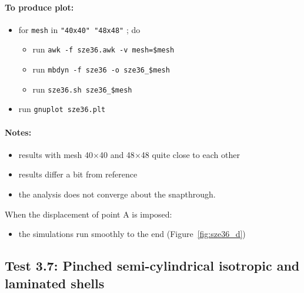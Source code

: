 \documentclass{article}
\newcommand{\mesh}[2]{#1$\times$#2}
\begin{document}
\paragraph{To produce plot:}
\begin{itemize}
\item for \verb!mesh! in \verb!"40x40" "48x48"! ; do
	\begin{itemize}
	\item run \verb!awk -f sze36.awk -v mesh=$mesh!
	\item run \verb!mbdyn -f sze36 -o sze36_$mesh!
	\item run \verb!sze36.sh sze36_$mesh!
	\end{itemize}
\item run \verb!gnuplot sze36.plt!
\end{itemize}

\paragraph{Notes:}
\begin{itemize}
\item results with mesh \mesh{40}{40} and \mesh{48}{48} quite close to each other
\item results differ a bit from reference
\item the analysis does not converge about the snapthrough.
\end{itemize}
When the displacement of point A is imposed:
\begin{itemize}
\item the simulations run smoothly to the end (Figure~\ref{fig:sze36_d})
\end{itemize}


\subsection{Test 3.7: Pinched semi-cylindrical isotropic and laminated shells}
\end{document}
